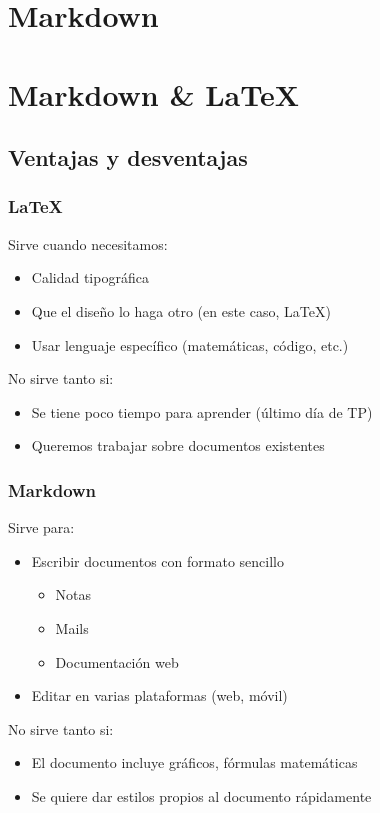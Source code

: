 \documentclass[svgnames]{beamer}
\begin{document}
\section{Markdown}

\section{Markdown \& \LaTeX}
\subsection{Ventajas y desventajas}
\begin{frame}
  \frametitle{\LaTeX}
  Sirve cuando necesitamos:
  \begin{itemize}
    \item Calidad tipográfica
    \item Que el diseño lo haga otro (en este caso, \LaTeX)
    \item Usar lenguaje específico (matemáticas, código, etc.)
  \end{itemize}\pause
  No sirve tanto si:
  \begin{itemize}
    \item Se tiene poco tiempo para aprender (último día de TP)
    \item Queremos trabajar sobre documentos existentes
  \end{itemize}
\end{frame}

\begin{frame}
  \frametitle{Markdown}
  Sirve para:
  \begin{itemize}
    \item Escribir documentos con formato sencillo
    \begin{itemize}
      \item Notas
      \item Mails
      \item Documentación web
    \end{itemize}
    \item Editar en varias plataformas (web, móvil) 
  \end{itemize}\pause
  No sirve tanto si:
  \begin{itemize}
    \item El documento incluye gráficos, fórmulas matemáticas
    \item Se quiere dar estilos propios al documento rápidamente
  \end{itemize}
\end{frame}
\end{document}
